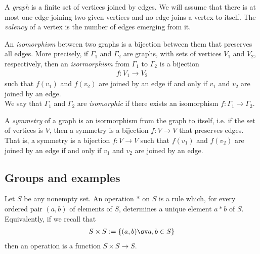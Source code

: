 \documentclass{article}
\begin{document}
\begin{definition}
    A \emph{graph} is a finite set of vertices joined by edges. We will
    assume that there is at most one edge joining two given vertices and
    no edge joins a vertex to itself. The \emph{valency} of a vertex
    is the number of edges emerging from it.
\end{definition}

\setcounter{theorem}{2}
\begin{definition}
    An \emph{isomorphism} between two graphs is a bijection between them
    that preserves all edges. More precisely, if $\Gamma_1$ and $\Gamma_2$
    are graphs, with sets of vertices $V_1$ and $V_2$, respectively, then
    an \emph{isormorphism} from $\Gamma_1$ to $\Gamma_2$ is a bijection
    \begin{align*}
        f:V_1\to V_2
    \end{align*}
    such that $f(v_1)$ and $f(v_2)$ are joined by an edge if and only if
    $v_1$ and $v_2$ are joined by an edge.\\
    We say that $\Gamma_1$ and $\Gamma_2$ are \emph{isomorphic} if there
    exists an isomorphism $f:\Gamma_1\to \Gamma_2$.
\end{definition}

\setcounter{theorem}{8}
\begin{definition}
    A \emph{symmetry} of a graph is an isormorphism from the graph to
    itself, i.e. if the set of vertices is $V$, then a symmetry is a
    bijection $f:V\to V$ that preserves edges. That is, a symmetry is
    a bijection $f:V\to V$ such that $f(v_1)$ and $f(v_2)$ are joined
    by an edge if and only if $v_1$ and $v_2$ are joined by an edge.
\end{definition}

\subsection{Groups and examples}

\begin{definition}
    Let $S$ be any nonempty set. An operation $*$ on $S$ is a rule
    which, for every ordered pair $(a,b)$ of elements of $S$, determines
    a unique element $a* b$ of $S$. Equivalently, if we recall that
    \begin{align*}
        S\times S := \{(a,b) \sv a,b\in S\}
    \end{align*}
    then an operation is a function $S\times S\to S$.
\end{definition}
\end{document}

